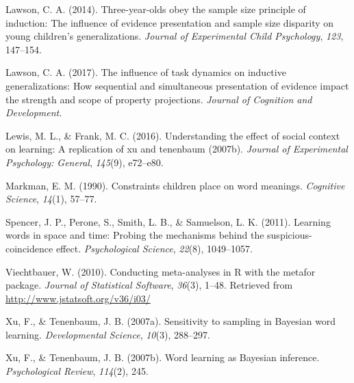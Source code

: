 \documentclass[english,floatsintext,man]{apa6}
\theoremstyle{definition}
\theoremstyle{definition}
\theoremstyle{remark}
\begin{document}
\setlength{\parindent}{-0.5in} \setlength{\leftskip}{0.5in}

\hypertarget{refs}{}
\hypertarget{ref-lawson2014three}{}
Lawson, C. A. (2014). Three-year-olds obey the sample size principle of
induction: The influence of evidence presentation and sample size
disparity on young children's generalizations. \emph{Journal of
Experimental Child Psychology}, \emph{123}, 147--154.

\hypertarget{ref-lawson2017influence}{}
Lawson, C. A. (2017). The influence of task dynamics on inductive
generalizations: How sequential and simultaneous presentation of
evidence impact the strength and scope of property projections.
\emph{Journal of Cognition and Development}.

\hypertarget{ref-lewis2016understanding}{}
Lewis, M. L., \& Frank, M. C. (2016). Understanding the effect of social
context on learning: A replication of xu and tenenbaum (2007b).
\emph{Journal of Experimental Psychology: General}, \emph{145}(9),
e72--e80.

\hypertarget{ref-markman1990constraints}{}
Markman, E. M. (1990). Constraints children place on word meanings.
\emph{Cognitive Science}, \emph{14}(1), 57--77.

\hypertarget{ref-spencer2011learning}{}
Spencer, J. P., Perone, S., Smith, L. B., \& Samuelson, L. K. (2011).
Learning words in space and time: Probing the mechanisms behind the
suspicious-coincidence effect. \emph{Psychological Science},
\emph{22}(8), 1049--1057.

\hypertarget{ref-R-metafor}{}
Viechtbauer, W. (2010). Conducting meta-analyses in R with the metafor
package. \emph{Journal of Statistical Software}, \emph{36}(3), 1--48.
Retrieved from \url{http://www.jstatsoft.org/v36/i03/}

\hypertarget{ref-xu2007}{}
Xu, F., \& Tenenbaum, J. B. (2007a). Sensitivity to sampling in Bayesian
word learning. \emph{Developmental Science}, \emph{10}(3), 288--297.

\hypertarget{ref-xu2007word}{}
Xu, F., \& Tenenbaum, J. B. (2007b). Word learning as Bayesian
inference. \emph{Psychological Review}, \emph{114}(2), 245.
\end{document}
